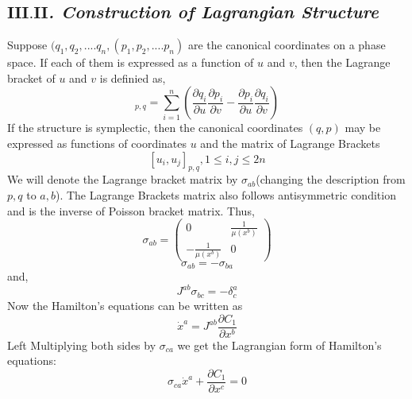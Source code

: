 \documentclass[14pt]{extarticle}
\begin{document}
\subsection*{\textit{$\mathbf{III.II}$. Construction of Lagrangian Structure}}
Suppose $(q_{1}, q_{2},....q_{n},(p_{1}, p_{2},....p_{n})$ are the canonical coordinates on a phase space. If each of them is expressed as a function of $u$ and $v$, then the Lagrange bracket of $u$ and $v$ is definied as,\\
\begin{equation}
[u, v]_{p, q}=\sum_{i=1}^{n}\left(\frac{\partial q_{i}}{\partial u} \frac{\partial p_{i}}{\partial v}-\frac{\partial p_{i}}{\partial u} \frac{\partial q_{i}}{\partial v}\right)
\end{equation}
If the structure is symplectic, then the canonical coordinates $(q,p)$ may be expressed as functions of coordinates $u$ and the matrix of Lagrange Brackets \\
\begin{equation}
\left[u_{i}, u_{j}\right]_{p, q}   , 1 \leq i, j \leq 2 n
\end{equation}
We will denote the Lagrange bracket matrix by $\sigma_{a b}$(changing the description from $p,q$ to $a,b$). The Lagrange Brackets matrix also follows antisymmetric condition and is the inverse of Poisson bracket matrix. Thus, \\
\begin{equation*}
\sigma_{a b}=\left( \begin{array}{cc}{0} & {\frac{1}{\mu\left(x^{b}\right)}} \\ {-\frac{1}{\mu\left(x^{b}\right)}} & {0}\end{array}\right)
\end{equation*}
\begin{equation*}
\sigma_{a b}=-\sigma_{b a}
\end{equation*}
and,
\begin{equation}
J^{a b} \sigma_{b c}=-\delta^{a}_{c}
\end{equation} 
Now the Hamilton's equations can be written as \\
\begin{equation}
\dot{x}^{a}=J^{a b} \frac{\partial C_{1}}{\partial x^{b}}
\end{equation}
Left Multiplying both sides by $\sigma_{c a}$ we get the Lagrangian form of Hamilton's equations:\\
\begin{equation}
\sigma_{c a} \dot{x}^{a}+\frac{\partial C_{1}}{\partial x^{c}}=0
\end{equation} 
\end{document}
